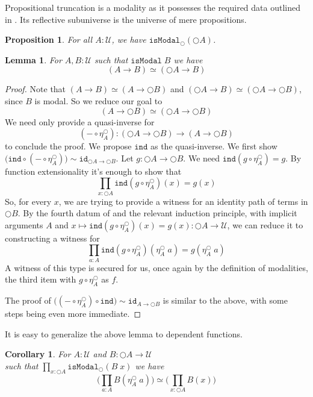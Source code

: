 \documentclass[12pt]{report}
\newtheorem{lem}[thm]{Lemma}
\newtheorem{cor}[thm]{Corollary}
\newtheorem{prop}[thm]{Proposition}
\theoremstyle{definition}
\begin{document}
Propositional truncation is a modality as it possesses the required data outlined in . 
Its reflective subuniverse is the universe of mere propositions.  
\begin{prop}
For all $A  :\mathcal{U}$, we have $\mathtt{isModal}_{\bigcirc}(\bigcirc A)$. 
\end{prop}
\begin{lem}
For $A, B : \mathcal{U}$ such that $\mathtt{isModal}\; B$ we have
$$(A\rightarrow B) \simeq (\bigcirc A \rightarrow B)$$
\end{lem}
\begin{proof}
Note that $(A\rightarrow B) \simeq (A\rightarrow \bigcirc B)$ and $(\bigcirc A \rightarrow B) \simeq (\bigcirc A \rightarrow \bigcirc B)$, since $B$ is modal. 
So we reduce our goal to 
$$(A\rightarrow \bigcirc B) \simeq (\bigcirc A \rightarrow \bigcirc B)$$
We need only provide a quasi-inverse for 
$$(-\circ \eta_A^{\bigcirc}) : (\bigcirc A \rightarrow \bigcirc B) \rightarrow (A\rightarrow \bigcirc B)$$
 to conclude the proof. 
We propose $\mathtt{ind}$ as the quasi-inverse. 
We first show $\big(\mathtt{ind}\circ (-\circ \eta_A^{\bigcirc})\big) \sim \mathtt{id}_{\bigcirc A \rightarrow \bigcirc B}$. 
Let $g : \bigcirc A \rightarrow \bigcirc B$. 
We need $\mathtt{ind}(g\circ \eta_A^\bigcirc ) = g$. 
By function extensionality it's enough to show that 
$$\prod_{x : \bigcirc A}\mathtt{ind}(g\circ \eta_A^\bigcirc )(x) = g(x)$$
So, for every $x$, we are trying to provide a witness for an identity path of terms in $\bigcirc B$. 
By the fourth datum of  and the relevant induction principle, with implicit arguments $A$ and $x\mapsto \mathtt{ind}(g\circ \eta_A^\bigcirc )(x) = g(x) : \bigcirc A \rightarrow \mathcal{U}$, we can reduce it to constructing a witness for
$$\prod_{a : A} \mathtt{ind}(g\circ \eta_A^\bigcirc )(\eta^\bigcirc_{A}\;a) = g(\eta^\bigcirc_{A}\;a)$$
A witness of this type is secured for us, once again by the definition of modalities, the third item with $g \circ \eta_A^\bigcirc $ as $f$. 

The proof of $\big( (-\circ \eta_A^{\bigcirc})\circ \mathtt{ind}\big) \sim \mathtt{id}_{A \rightarrow \bigcirc B}$ 
is similar to the above, with some steps being even more immediate. 
\end{proof}
It is easy to generalize the above lemma to dependent functions.
\begin{cor}
For $A : \mathcal{U}$ and $B : \bigcirc A \rightarrow \mathcal{U}$ \\
such that $\prod_{x : \bigcirc A}\mathtt{isModal}_\bigcirc (B\;x)$ we have
$$\Big(\prod_{a : A}B(\eta_A^\bigcirc \; a)\Big) \simeq \Big( \prod_{x : \bigcirc A}B(x) \Big)$$
\end{cor}
\end{document}
